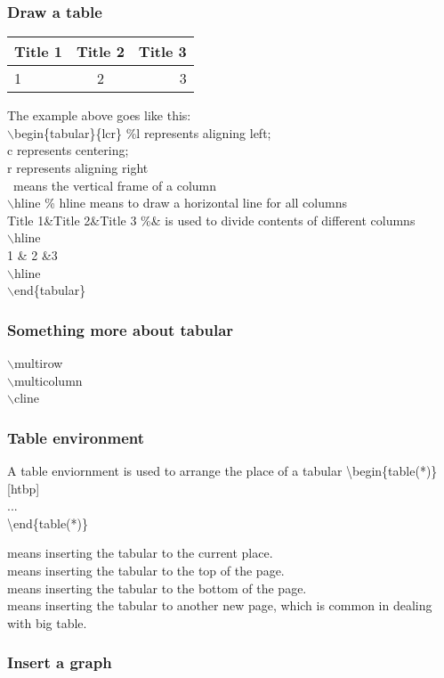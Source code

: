 \documentclass{beamer}
\begin{document}
\begin{frame}
	\frametitle{Draw a table}
    \begin{example}
        \begin{tabular}{|l|c|r|}
        \hline
        Title 1 & Title 2 & Title 3 \\
        \hline
        1 & 2 &3 \\
        \hline
        \end{tabular}
    \end{example}
    The example above goes like this:\\
        $\backslash$begin\{tabular\}\{\textvertline l\textvertline c\textvertline r\textvertline \} \%l represents aligning left; 
        \\ \qquad \qquad \qquad \qquad \qquad \quad c represents centering; 
        \\ \qquad \qquad \qquad \qquad \qquad \quad r represents aligning right
        \\ \qquad \qquad \qquad \qquad \qquad \quad \textvertline \, means the vertical frame of a column\\
        $\backslash$hline \quad \% hline means to draw a horizontal line for all columns\\
        Title 1\&Title 2\&Title 3  \%\& is used to divide contents of different columns\\
        $\backslash$hline\\
        1 \& 2 \&3 \\
        $\backslash$hline\\
        $\backslash$end\{tabular\}
\end{frame}
\begin{frame}
   \frametitle{Something more about tabular}
   $\backslash$multirow \\
   $\backslash$multicolumn \\
   $\backslash$cline{} \\
\end{frame}
\begin{frame}
	\frametitle{Table environment}
    \begin{definition}
    A {\color{blue}table} enviornment is used to arrange the place of a tabular
		{\color{red}\textbackslash begin\{table(*)\}[htbp]}\\
		\quad ...\\
		{\color{red}\textbackslash end\{table(*)\}}\\
	\end{definition}
    \text{[h]} means inserting the tabular to the current place.
    \\\text{[t]} means inserting the tabular to the top of the page.
    \\\text{[b]} means inserting the tabular to the bottom of the page.
    \\\text{[p]} means inserting the tabular to another new page, which is common in dealing with big table.
\end{frame}
\begin{frame}
	\frametitle{Insert a graph}
    
\end{frame}
\end{document}
